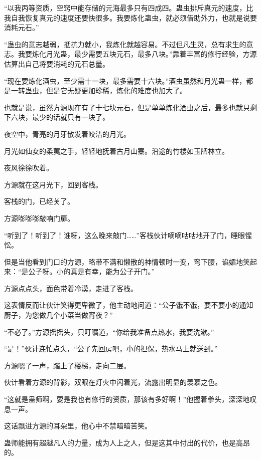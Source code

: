 
\begin{this_body}



“以我丙等资质，空窍中能存储的元海最多只有四成四。蛊虫排斥真元的速度，比我自我恢复真元的速度还要快很多。我要炼化蛊虫，就必须借助外力，也就是说要消耗元石。”

“蛊虫的意志越弱，抵抗力就小，我炼化就越容易。不过但凡生灵，总有求生的意志。我要炼化月光蛊，最少需要五块元石，最多八块。”靠着丰富的修行经验，方源估算出自己将要消耗的元石总量。

“现在要炼化酒虫，至少需十一块，最多需要十六块。”酒虫虽然和月光蛊一样，都是一转蛊虫，但是它无疑更加珍稀，炼化的难度也加大了。

也就是说，虽然方源现在有了十七块元石，但是单单炼化酒虫之后，最多也就只剩下六块，最少的话就只有一块了。

夜空中，青亮的月牙散发着皎洁的月光。

月光如仙女的柔荑之手，轻轻地抚着古月山寨。沿途的竹楼如玉牌林立。

夜风徐徐吹着。

方源就在这月光下，回到客栈。

客栈的门，已经关了。

方源嘭嘭嘭敲响门扉。

“听到了！听到了！谁呀，这么晚来敲门……”客栈伙计嘀嘀咕咕地开了门，睡眼惺忪。

但是当他看到门口的方源，略带不满和懒散的神情顿时一变，弯下腰，谄媚地笑起来：“是公子呀。小的真是有幸，能为公子开门。”

方源点点头，面色带着冷漠，走进了客栈。

这表情反而让伙计笑得更卑微了，他主动地问道：“公子饿不饿，要不要小的通知厨子，为您做几个小菜当做宵夜？”

“不必了。”方源摇摇头，只叮嘱道，“你给我准备点热水，我要洗漱。”

“是！”伙计连忙点头，“公子先回房吧，小的担保，热水马上就送到。”

方源嗯了一声，踏上了楼梯，走向二层。

伙计看着方源的背影，双眼在灯火中闪着光，流露出明显的羡慕之色。

“这就是蛊师啊，要是我也有修行的资质，那该有多好啊！”他握着拳头，深深地叹息一声。

这话飘进方源的耳朵里，他心中不禁暗暗苦笑。

蛊师能拥有超越凡人的力量，成为人上之人，但是这其中付出的代价，也是高昂的。


\end{this_body}
